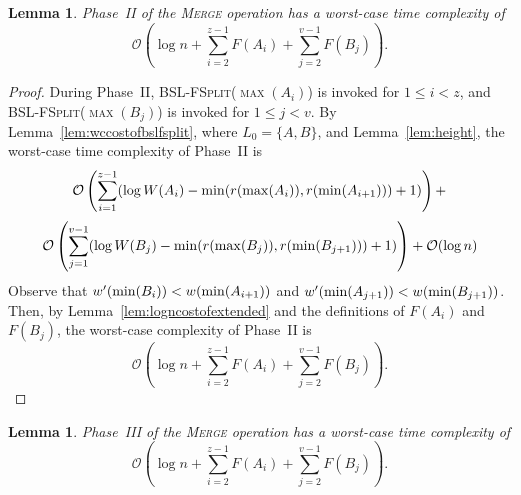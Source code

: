 \documentclass[11pt]{article}
\newcommand{\kwUnion}{Merge}
\newcommand{\Union}{\mbox{\textsc{\kwUnion{}}}}
\newcommand{\Bslfsplx}[1]{\mbox{\textsc{BSL-FSplit(\ensuremath{#1})}}}
\newcommand{\lasta}{z}
\newcommand{\lastb}{v}
\newcommand{\intmax}[1]{\ensuremath{\max(\intl #1)}}
\newcommand{\intmin}[1]{\ensuremath{\min(\intl #1)}}
\newcommand{\intl}[1]{\ensuremath{#1}}
\newcommand{\intweight}[1]{{\ensuremath{W(\intl #1)}}}
\newcommand{\nodeweight}[1]{{\ensuremath{w(\node #1)}}}
\newcommand{\nodenewweight}[1]{{\ensuremath{w'(\node #1)}}}
\newcommand{\noderank}[1]{\ensuremath{r(\node #1)}}
\newcommand{\node}[1]{\ensuremath{#1}}
\newcommand{\intfun}[1]{\ensuremath{F(\intl #1)}}
\newcounter{count}
\newtheorem{lemma}[count]{Lemma}
\begin{document}
\begin{lemma} 
\label{lem:phasetwo} 
Phase~II of the \Union{} operation has a worst-case time complexity of \[\mathcal O\left(\log n + \sum_{i=2}^{\lasta-1} \intfun{A_i} +\sum_{j=2}^{\lastb-1} \intfun{B_j}\right).\] 
\end{lemma} 

\begin{proof} 
During Phase~II, \Bslfsplx{\intmax{A_i}} is invoked for $1\leq i< \lasta$, and \Bslfsplx{\intmax{B_j}} is invoked for $1\leq j< \lastb$. 
By Lemma~\ref{lem:wccostofbslfsplit}, 
where $L_{0} = \{A,B\}$,
and Lemma~\ref{lem:height}, the worst-case time complexity of Phase~II is 
\[ 
\mathcal O\left(\sum_{i=1}^{\lasta-1} (\log\intweight{A_i} - \min(\noderank{\intmax{A_i}},\noderank{\intmin{A_{i+1}}})+1)\right)+ 
\] 
\[\mathcal O\left(\sum_{j=1}^{\lastb-1} (\log\intweight{B_j} - \min(\noderank{\intmax{B_j}},\noderank{\intmin{B_{j+1}}})+1)\right)+
\mathcal O(\log n)\] 
Observe that $\nodenewweight{\intmin{B_i}}<\nodeweight{\intmin{A_{i+1}}}$ and $\nodenewweight{\intmin{A_{j+1}}}<\nodeweight{\intmin{B_{j+1}}}$. Then, by Lemma~\ref{lem:logncostofextended} and the definitions of \intfun{A_i} and \intfun{B_j}, the worst-case complexity of Phase~II is 
\[\mathcal O\left(\log n + \sum_{i=2}^{\lasta-1} \intfun{A_i} +\sum_{j=2}^{\lastb-1} \intfun{B_j}\right).\] 
\end{proof} 


\begin{lemma} 
\label{lem:phasethree} 
Phase~III of the \Union{} operation has a worst-case time complexity of \[\mathcal O\left(\log n +\sum_{i=2}^{\lasta-1} \intfun{A_i}  +\sum_{j=2}^{\lastb-1} \intfun{B_j} \right).\] 
\end{lemma} 
\end{document}
